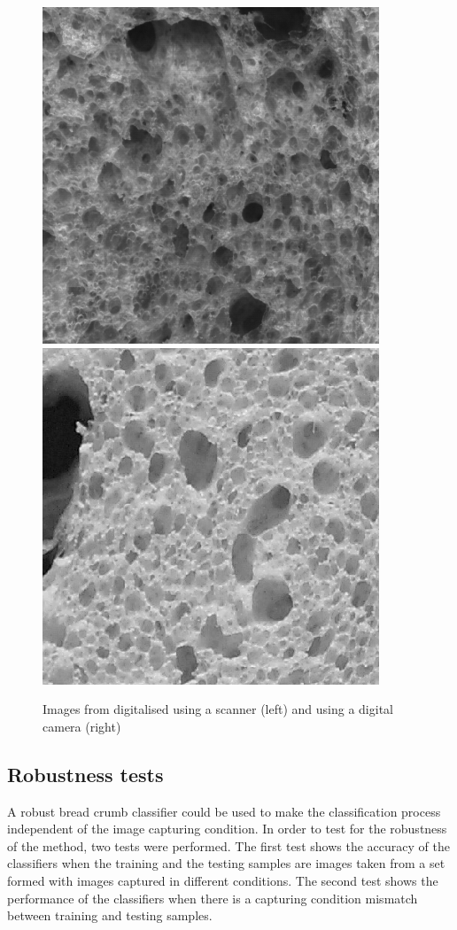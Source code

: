 \documentclass[oneside,a4paper,english,links]{amca}
\begin{document}
\begin{figure}[ht!b]
\centering
\includegraphics[scale=0.28]{imagenes/gonzales/allied1}
\includegraphics[scale=0.28]{imagenes/gonzales/allied2c}
\caption{Images from \cite{Gonzales2008} digitalised using a scanner (left) and using a digital camera (right)}
\label{fig:gonzales}
\end{figure}

\subsection{Robustness tests}
A robust bread crumb classifier could be used to make the classification process independent of the image capturing condition. In order to test for the robustness of the method, two tests were performed. The first test shows the accuracy of the classifiers when the training and the testing samples are images taken from a set formed with images captured in different conditions. The second test shows the performance of the classifiers when there is a capturing condition mismatch between training and testing samples.
\end{document}
